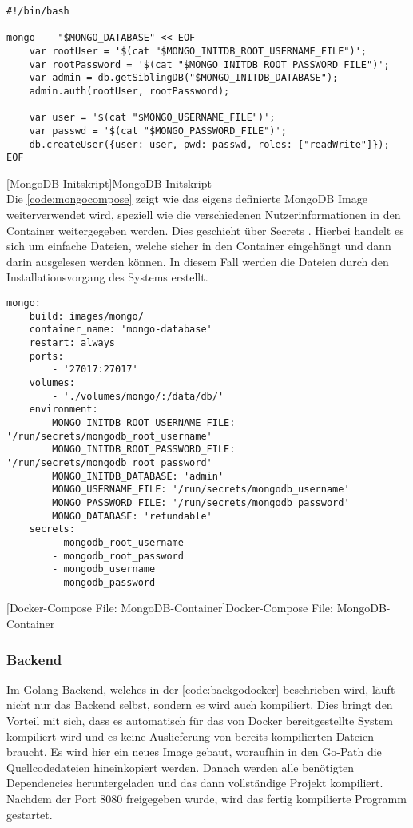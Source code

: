\newpage

\begin{verbatim}
#!/bin/bash

mongo -- "$MONGO_DATABASE" << EOF
	var rootUser = '$(cat "$MONGO_INITDB_ROOT_USERNAME_FILE")';
	var rootPassword = '$(cat "$MONGO_INITDB_ROOT_PASSWORD_FILE")';
	var admin = db.getSiblingDB("$MONGO_INITDB_DATABASE");
	admin.auth(rootUser, rootPassword);

	var user = '$(cat "$MONGO_USERNAME_FILE")';
	var passwd = '$(cat "$MONGO_PASSWORD_FILE")';
	db.createUser({user: user, pwd: passwd, roles: ["readWrite"]});
EOF
\end{verbatim}
[MongoDB Initskript]{MongoDB Initskript}
\label{code:mongoskript}
~\\
Die \autoref{code:mongocompose} zeigt wie das eigens definierte MongoDB Image weiterverwendet wird, speziell wie die verschiedenen Nutzerinformationen in den Container weitergegeben werden. Dies geschieht über Secrets \cite{secretmongo}. Hierbei handelt es sich um einfache Dateien, welche sicher in den Container eingehängt und dann darin ausgelesen werden können. In diesem Fall werden die Dateien durch den Installationsvorgang des Systems erstellt. 

\begin{verbatim}
mongo:
	build: images/mongo/
	container_name: 'mongo-database'
	restart: always
	ports:
		- '27017:27017'
	volumes:
		- './volumes/mongo/:/data/db/'
	environment:
		MONGO_INITDB_ROOT_USERNAME_FILE: '/run/secrets/mongodb_root_username'
		MONGO_INITDB_ROOT_PASSWORD_FILE: '/run/secrets/mongodb_root_password'
		MONGO_INITDB_DATABASE: 'admin'
		MONGO_USERNAME_FILE: '/run/secrets/mongodb_username'
		MONGO_PASSWORD_FILE: '/run/secrets/mongodb_password'
		MONGO_DATABASE: 'refundable'
	secrets:
		- mongodb_root_username
		- mongodb_root_password
		- mongodb_username
		- mongodb_password
\end{verbatim}
[Docker-Compose File: MongoDB-Container]{Docker-Compose File: MongoDB-Container}
\label{code:mongocompose}

\newpage

\subsubsection{Backend}

Im Golang-Backend, welches in der \autoref{code:backgodocker} beschrieben wird, läuft nicht nur das Backend selbst, sondern es wird auch kompiliert. Dies bringt den Vorteil mit sich, dass es automatisch für das von Docker bereitgestellte System kompiliert wird und es keine Auslieferung von bereits kompilierten Dateien braucht. Es wird hier ein neues Image gebaut, woraufhin in den Go-Path die Quellcodedateien hineinkopiert werden. Danach werden alle benötigten Dependencies heruntergeladen und das dann vollständige Projekt kompiliert. Nachdem der Port 8080 freigegeben wurde, wird das fertig kompilierte Programm gestartet.

